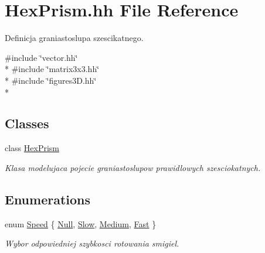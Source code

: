 \hypertarget{_hex_prism_8hh}{}\section{Hex\+Prism.\+hh File Reference}
\label{_hex_prism_8hh}


Definicja graniastoslupa szescikatnego.  


{\ttfamily \#include \char`\"{}vector.\+hh\char`\"{}}\\*
{\ttfamily \#include \char`\"{}matrix3x3.\+hh\char`\"{}}\\*
{\ttfamily \#include \char`\"{}figures3\+D.\+hh\char`\"{}}\\*
\subsection*{Classes}
\begin{DoxyCompactItemize}
\item 
class \hyperlink{class_hex_prism}{Hex\+Prism}
\begin{DoxyCompactList}\small\item\em Klasa modelujaca pojecie graniastoslupow prawidlowych szesciokatnych. \end{DoxyCompactList}\end{DoxyCompactItemize}
\subsection*{Enumerations}
\begin{DoxyCompactItemize}
\item 
enum \hyperlink{_hex_prism_8hh_ad57b3fa8e45359906ac229567c209a63}{Speed} \{ \hyperlink{_hex_prism_8hh_ad57b3fa8e45359906ac229567c209a63a727b8a8d744d88f4d9596d91abfdf277}{Null}, 
\hyperlink{_hex_prism_8hh_ad57b3fa8e45359906ac229567c209a63a15e47d3c9733bd519c1bd00349ce10e3}{Slow}, 
\hyperlink{_hex_prism_8hh_ad57b3fa8e45359906ac229567c209a63a8cfb9311a439a51b14159ed0970f398b}{Medium}, 
\hyperlink{_hex_prism_8hh_ad57b3fa8e45359906ac229567c209a63a44e0add47cd0ec96505d444d425b70af}{Fast}
 \}\begin{DoxyCompactList}\small\item\em Wybor odpowiedniej szybkosci rotowania smigiel. \end{DoxyCompactList}
\end{DoxyCompactItemize}

